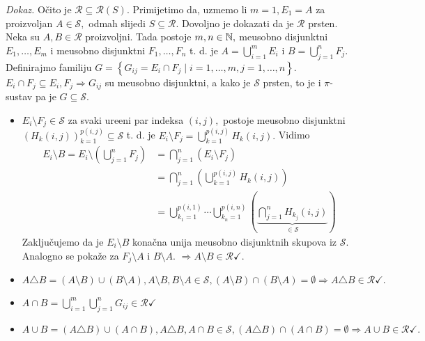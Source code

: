 \documentclass{article}
\begin{document}
\textit{Dokaz.}\newline
Očito je \(\mathcal R\subseteq\mathcal R(S).\) Primijetimo da, uzmemo li \(m=1, E_1=A\) za proizvoljan \(A\in\mathcal S,\) odmah slijedi \(S\subseteq\mathcal R.\) Dovoljno je dokazati da je \(\mathcal R\) prsten. Neka su \(A,B\in\mathcal R\) proizvoljni. Tada postoje \(m,n\in\Bbb N,\) me\dj{}usobno disjunktni \(E_1,\ldots,E_m\) i me\dj{}usobno disjunktni \(F_1,\ldots,F_n\) t. d. je \(A=\bigcup_{i=1}^mE_i\) i \(B=\bigcup_{j=1}^nF_j.\) Definirajmo familiju \(G=\left\{G_{ij}=E_i\cap F_j\mid i=1,\ldots,m,j=1,\ldots,n\right\}.\)\newline \(E_i\cap F_j\subseteq E_i,F_j\Rightarrow G_{ij}\) su me\dj{}usobno disjunktni, a kako je \(\mathcal S\) prsten, to je i \(\pi\)-sustav pa je \(G\subseteq\mathcal S.\) 
\begin{itemize}
    \item[] \(E_i\setminus F_j\in\mathcal S\) za svaki ure\dj{}eni par indeksa \((i,j),\) postoje me\dj{}usobno disjunktni \((H_{k}(i,j))_{k=1}^{p(i,j)}\subseteq\mathcal S\) t. d. je \(E_i\setminus F_j=\bigcup_{k=1}^{p(i,j)}H_k(i,j).\) Vidimo \[\begin{aligned}E_i\setminus B=E_i\setminus\left(\bigcup_{j=1}^nF_j\right)&=\bigcap_{j=1}^n\left(E_i\setminus F_j\right)\\&=\bigcap_{j=1}^n\left(\bigcup_{k=1}^{p(i,j)}H_k(i,j)\right)\\&=\bigcup_{k_1=1}^{p(i,1)}\cdots\bigcup_{k_n=1}^{p(i,n)}\left(\underbrace{\bigcap_{j=1}^nH_{k_j}(i,j)}_{\in\mathcal S}\right)\end{aligned}\] Zaključujemo da je \(E_i\setminus B\) konačna unija me\dj{}usobno disjunktnih skupova iz \(\mathcal S.\) Analogno se pokaže za \(F_j\setminus A\) i \(B\setminus A.\) \(\Rightarrow A\setminus B\in\mathcal R\checkmark.\)
    \item[] \(A\triangle B=(A\setminus B)\cup (B\setminus A), A\setminus B,B\setminus A\in\mathcal S,(A\setminus B)\cap(B\setminus A)=\emptyset\Rightarrow A\triangle B\in\mathcal R\checkmark.\)
    \item[] \(A\cap B=\bigcup_{i=1}^m\bigcup_{j=1}^nG_{ij}\in\mathcal R\checkmark\)
    \item[] \(A\cup B=(A\triangle B)\cup(A\cap B),A\triangle B,A\cap B\in\mathcal S,(A\triangle B)\cap(A\cap B)=\emptyset\Rightarrow A\cup B\in\mathcal R\checkmark.\) 
\end{itemize}
\end{document}
